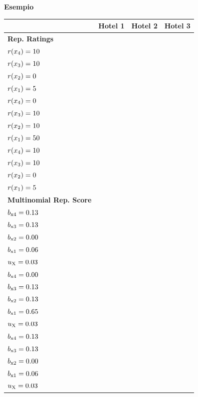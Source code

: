 \documentclass[letterpaper]{article} %
\begin{document}
\newpage
\textbf{Esempio}
\renewcommand*{\arraystretch}{2}
\begin{table}[htbp]
	\centering
	\begin{tabular}{| p{2cm} | p{1.5cm} | p{1.5cm} | p{1.5cm}|}
		\hline
		\textbf{} & Hotel 1 & Hotel 2 & Hotel 3\\
		\hline
		\textbf{Rep. Ratings} & \makecell{$r(x\textsubscript{5}) = 50$\\$r(x\textsubscript{4}) = 10$\\$r(x\textsubscript{3}) = 10$\\$r(x\textsubscript{2}) = 0$\\$r(x\textsubscript{1}) = 5$} & \makecell{$r(x\textsubscript{5}) = 5$\\$r(x\textsubscript{4}) = 0$\\$r(x\textsubscript{3}) = 10$\\$r(x\textsubscript{2}) = 10$\\$r(x\textsubscript{1}) = 50$} & \makecell{$r(x\textsubscript{5}) = 50$\\$r(x\textsubscript{4}) = 10$\\$r(x\textsubscript{3}) = 10$\\$r(x\textsubscript{2}) = 0$\\$r(x\textsubscript{1}) = 5$}\\ \hline
		\textbf{Multinomial Rep. Score} & \makecell{$b\textsubscript{x5} =
			0.65$\\$b\textsubscript{x4} = 0.13$\\$b\textsubscript{x3} = 0.13$\\$b\textsubscript{x2} = 0.00$\\$b\textsubscript{x1} = 0.06$\\$u\textsubscript{X} = 0.03$} & \makecell{$b\textsubscript{x5} =
			0.06$\\$b\textsubscript{x4} = 0.00$\\$b\textsubscript{x3} = 0.13$\\$b\textsubscript{x2} = 0.13$\\$b\textsubscript{x1} = 0.65$\\$u\textsubscript{X} = 0.03$} & \makecell{$b\textsubscript{x5} =
			0.65$\\$b\textsubscript{x4} = 0.13$\\$b\textsubscript{x3} = 0.13$\\$b\textsubscript{x2} = 0.00$\\$b\textsubscript{x1} = 0.06$\\$u\textsubscript{X} = 0.03$} \\ \hline

\end{tabular}
\end{table}
\end{document}
